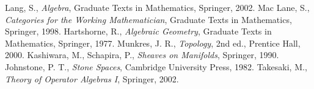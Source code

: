 \documentclass{article}
\theoremstyle{plain}
\theoremstyle{definition}
\begin{document}

\begin{thebibliography}{9}
 Lang, S., \emph{Algebra}, Graduate Texts in Mathematics, Springer, 2002.
 Mac Lane, S., \emph{Categories for the Working Mathematician}, Graduate Texts in Mathematics, Springer, 1998.
 Hartshorne, R., \emph{Algebraic Geometry}, Graduate Texts in Mathematics, Springer, 1977.
 Munkres, J. R., \emph{Topology}, 2nd ed., Prentice Hall, 2000.
 Kashiwara, M., Schapira, P., \emph{Sheaves on Manifolds}, Springer, 1990.
 Johnstone, P. T., \emph{Stone Spaces}, Cambridge University Press, 1982.
 Takesaki, M., \emph{Theory of Operator Algebras I}, Springer, 2002.
\end{thebibliography}
\end{document}
